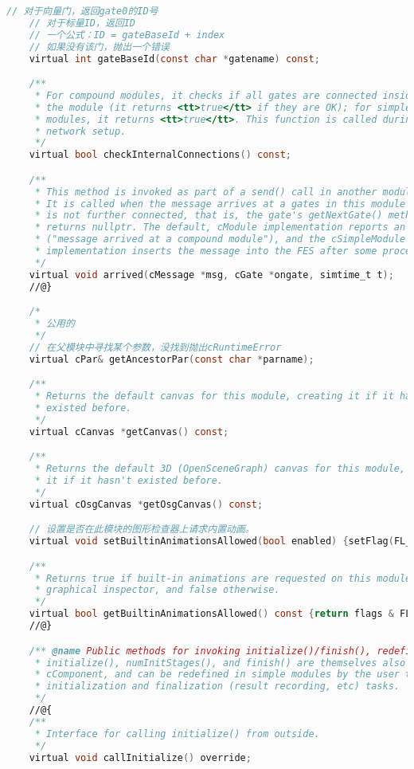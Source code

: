 \begin{lstlisting}[language=c,caption=My]
    // 对于向量门，返回gate0的ID号
    // 对于标量ID，返回ID
    // 一个公式：ID = gateBaseId + index
    // 如果没有该门，抛出一个错误
    virtual int gateBaseId(const char *gatename) const;

    /**
     * For compound modules, it checks if all gates are connected inside
     * the module (it returns <tt>true</tt> if they are OK); for simple
     * modules, it returns <tt>true</tt>. This function is called during
     * network setup.
     */
    virtual bool checkInternalConnections() const;

    /**
     * This method is invoked as part of a send() call in another module.
     * It is called when the message arrives at a gates in this module which
     * is not further connected, that is, the gate's getNextGate() method
     * returns nullptr. The default, cModule implementation reports an error
     * ("message arrived at a compound module"), and the cSimpleModule
     * implementation inserts the message into the FES after some processing.
     */
    virtual void arrived(cMessage *msg, cGate *ongate, simtime_t t);
    //@}

    /*
     * 公用的
     */
    // 在父模块中寻找某个参数，没找到抛出cRuntimeError
    virtual cPar& getAncestorPar(const char *parname);

    /**
     * Returns the default canvas for this module, creating it if it hasn't
     * existed before.
     */
    virtual cCanvas *getCanvas() const;

    /**
     * Returns the default 3D (OpenSceneGraph) canvas for this module, creating
     * it if it hasn't existed before.
     */
    virtual cOsgCanvas *getOsgCanvas() const;

    // 设置是否在此模块的图形检查器上请求内置动画。
    virtual void setBuiltinAnimationsAllowed(bool enabled) {setFlag(FL_BUILTIN_ANIMATIONS, enabled);}

    /**
     * Returns true if built-in animations are requested on this module's
     * graphical inspector, and false otherwise.
     */
    virtual bool getBuiltinAnimationsAllowed() const {return flags & FL_BUILTIN_ANIMATIONS;}
    //@}

    /** @name Public methods for invoking initialize()/finish(), redefined from cComponent.
     * initialize(), numInitStages(), and finish() are themselves also declared in
     * cComponent, and can be redefined in simple modules by the user to perform
     * initialization and finalization (result recording, etc) tasks.
     */
    //@{
    /**
     * Interface for calling initialize() from outside.
     */
    virtual void callInitialize() override;


\end{lstlisting}
